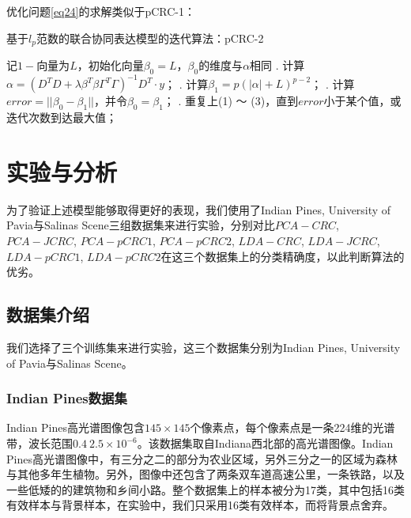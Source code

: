 \documentclass[12pt,a4paper]{article}
\begin{document}
优化问题\eqref{eq24}的求解类似于pCRC-1：
\begin{algorithm}[H] 
	\caption{基于$l_{p}$范数的联合协同表达模型的迭代算法：pCRC-2}  
	\label{alg:pCRC-2}  
	\begin{algorithmic}
		\STATE 记$1-$向量为$L$，初始化向量$\beta_{0} = L$，$\beta_{0}$的维度与$\alpha$相同
		. 计算$\alpha = (D^{T}D + \lambda \beta^{T}\beta\Gamma^{T}\Gamma)^{-1}D^{T} \cdot y$；   
		. 计算$\beta_{1} = p(|\alpha| + L)^{p - 2}$；
		. 计算$error = ||\beta_{0} - \beta_{1}||$，并令$\beta_{0} = \beta_{1}$；
		. 重复上(1) ～ (3)，直到$error$小于某个值，或迭代次数到达最大值；
	\end{algorithmic}  
\end{algorithm}  

\section{实验与分析}
为了验证上述模型能够取得更好的表现，我们使用了Indian Pines, University of Pavia与Salinas Scene三组数据集来进行实验，分别对比$PCA-CRC$, $PCA-JCRC$, $PCA-pCRC1$, $PCA-pCRC2$, $LDA-CRC$, $LDA-JCRC$, $LDA-pCRC1$, $LDA-pCRC2$在这三个数据集上的分类精确度，以此判断算法的优劣。

\subsection{数据集介绍}
我们选择了三个训练集来进行实验，这三个数据集分别为Indian Pines, University of Pavia与Salinas Scene。
\subsubsection{Indian Pines数据集}
Indian Pines高光谱图像包含$145\times 145$个像素点，每个像素点是一条224维的光谱带，波长范围$0.4 ~ 2.5 \times 10^{-6}$。该数据集取自Indiana西北部的高光谱图像。Indian Pines高光谱图像中，有三分之二的部分为农业区域，另外三分之一的区域为森林与其他多年生植物。另外，图像中还包含了两条双车道高速公里，一条铁路，以及一些低矮的的建筑物和乡间小路。整个数据集上的样本被分为17类，其中包括16类有效样本与背景样本，在实验中，我们只采用16类有效样本，而将背景点舍弃。
\end{document}
